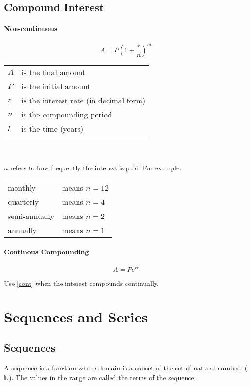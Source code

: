 \documentclass{article}
\numberwithin{equation}{section}
\begin{document}
\subsection{Compound Interest} \label{cmpint}
\paragraph{Non-continuous}
\begin{samepage}
\begin{equation}
	A = P {\left( 1 + \frac{r}{n} \right)} ^ {nt}
\end{equation}

\begin{tabular}{l l}
	$A$ & is the final amount \\
	$P$ & is the initial amount \\
	$r$ & is the interest rate (in decimal form) \\
	$n$ & is the compounding period \\
	$t$ & is the time (years)
\end{tabular}
\end{samepage}
\\ \\
$n$ refers to how frequently the interest is paid. For example:
\begin{center}
\begin{tabular}{l l}
	monthly & means $n=12$ \\
	quarterly& means $n=4$ \\
	semi-annually & means $n=2$ \\
	annually & means $n=1$
\end{tabular}
\end{center}

\paragraph{Continous Compounding}
\begin{equation} \label{cont}
	A = P e^{rt}
\end{equation}

Use \eqref{cont} when the interest compounds continually.

\section{Sequences and Series}

\subsection{Sequences}
A sequence is a function whose domain is a subset of the set of natural numbers ($\mathbb{N}$). The values in the range are called the terms of the sequence.
\end{document}
